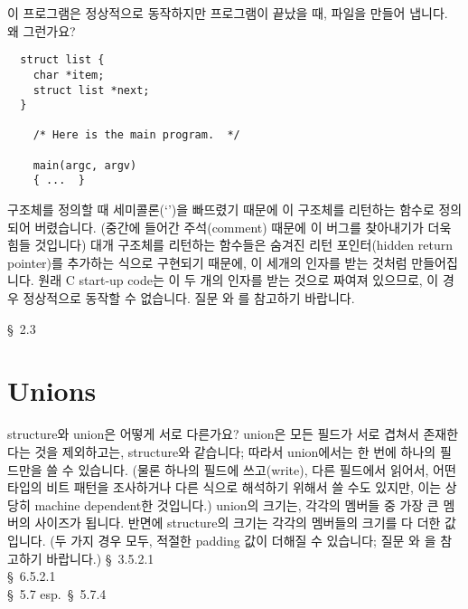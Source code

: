 \begin{faq}
	이 프로그램은 정상적으로 동작하지만 프로그램이 끝났을 때,
	 파일을 만들어 냅니다.  왜 그런가요?

\begin{verbatim}
  struct list {
    char *item;
    struct list *next;
  }

    /* Here is the main program.  */

    main(argc, argv)
    { ...  }
\end{verbatim}

\A
	구조체를 정의할 때 세미콜론(`\TT{;}')을 빠뜨렸기 때문에 이
	구조체를 리턴하는 함수로 정의되어 버렸습니다.  (중간에 들어간
	주석(comment) 때문에 이 버그를 찾아내기가 더욱 힘들 것입니다)
	대개 구조체를 리턴하는 함수들은 숨겨진 리턴 포인터(hidden return pointer)를
        추가하는 식으로 구현되기 때문에, 이 세개의 인자를 받는 것처럼
	만들어집니다.  원래
	C start-up code는 이 두 개의 인자를 받는 것으로 짜여져
	있으므로, 이 경우 정상적으로 동작할 수 없습니다.  질문 와 를
	참고하기 바랍니다.

\R 
	\cite{ctp} \S\ 2.3 
\end{faq}

\section{Unions}

\begin{faq}
        structure와 union은 어떻게 서로 다른가요?
\A
        union은 모든 필드가 서로 겹쳐서 존재한다는 것을 제외하고는, structure와 같습니다;
        따라서 union에서는 한 번에 하나의 필드만을 쓸 수 있습니다. (물론 하나의 필드에
        쓰고(write), 다른 필드에서 읽어서, 어떤 타입의 비트 패턴을 조사하거나 다른 식으로
        해석하기 위해서 쓸 수도 있지만, 이는 상당히 machine dependent한 것입니다.)
        union의 크기는, 각각의 멤버들 중 가장 큰 멤버의 사이즈가 됩니다. 반면에 structure의
        크기는 각각의 멤버들의 크기를 다 더한 값입니다. (두 가지 경우 모두, 적절한 padding 값이
        더해질 수 있습니다; 질문 와 을 참고하기 바랍니다.)
\R
        \cite{ansi} \S\ 3.5.2.1 \\
        \cite{c89} \S\ 6.5.2.1 \\
        \cite{hs} \S\ 5.7  esp.\ \S\ 5.7.4
\end{faq}

